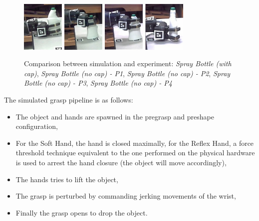 \begin{figure}[!!hbt]
\begin{center}
{ \includegraphics[width=0.18\textwidth]     {images/ssoch/fig/spray_p1}    \label{spray_p1}}
{ \includegraphics[width=0.18\textwidth]     {images/ssoch/fig/spray_p2}    \label{spray_p2}}
{ \includegraphics[width=0.18\textwidth]     {images/ssoch/fig/spray_p3}    \label{spray_p3}}
{ \includegraphics[width=0.18\textwidth]     {images/ssoch/fig/spray_p4}    \label{spray_p4}}
        \caption{Comparison between simulation and experiment: \emph{Spray Bottle (with cap)}, \emph{Spray Bottle (no cap) - P1}, \emph{Spray Bottle (no cap) - P2}, \emph{Spray Bottle (no cap) - P3}, \emph{Spray Bottle (no cap) - P4}}
        \label{spray}
        \end{center}
\end{figure}




The simulated grasp pipeline is as follows:
\begin{itemize}
\item The object and hands are spawned in the pregrasp and preshape configuration,
\item For the Soft Hand, the hand is closed maximally, for the Reflex Hand, a force threshold technique equivalent to the one performed on the physical hardware is used to arrest the hand closure (the object will move accordingly),
\item The hands tries to lift the object,
\item The grasp is perturbed by commanding jerking movements of the wrist,
\item Finally the grasp opens to drop the object.
\end{itemize}

